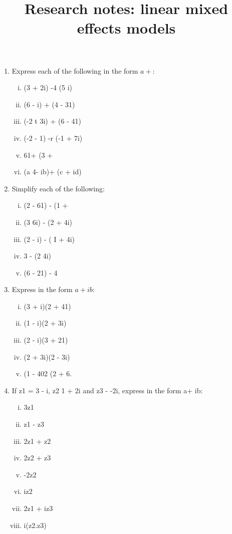 \documentclass[12pt, a4paper]{report}
\title{Research notes: linear mixed effects models}
\author{ } \date{ }
\theoremstyle{plain}
\theoremstyle{definition}
\theoremstyle{remark}
\begin{document}
\begin{enumerate}
\item Express each of the following in the form $a + $: 
\begin{multicols}{2}
\begin{enumerate}[(i)]
\item  (3 + 2i) -4 (5 i) 
\item  (6 - i) + (4 - 31) 
\item  (-2 t 3i) + (6 - 41) 
\item  (-2 - 1) -r (-1 + 7i) 
\item  61+ (3 + 
\item  (a 4- ib)+ (c + id) 
\end{enumerate}
\end{multicols}
\item Simplify each of the following: 
\begin{multicols}{2}
\begin{enumerate}[(i)]
\item (2 - 61) - (1 + 
\item (3 6i) - (2 + 4i) 
\item (2 - i) - ( I + 4i) 
\item 3 - (2 4i) 
\item (6 - 21) - 4
\end{enumerate}
\end{multicols}

\item  Express in the form $a + ib$: 
\begin{multicols}{2}
\begin{enumerate}[(i)]
\item (3 + i)(2 + 41) 
\item (1 - i)(2 + 3i) 
\item  (2 - i)(3 + 21) 
\item (2 + 3i)(2 - 3i) 
\item (1 - 402 (2 + 6. 
\end{enumerate}
\end{multicols}

\item  If z1 = 3 - i, z2 1 + 2i and z3 - -2i, express in the form a+ ib: \begin{multicols}{2}
\begin{enumerate}[(i)]
\item 3z1 
\item z1 - z3 
\item 2z1 + z2 
\item 2z2 + z3 \item -2z2 
\item iz2 
\item 2z1 + iz3 
\item i(z2.z3) 
\end{enumerate}
\end{multicols}


\end{enumerate}
\end{document}
